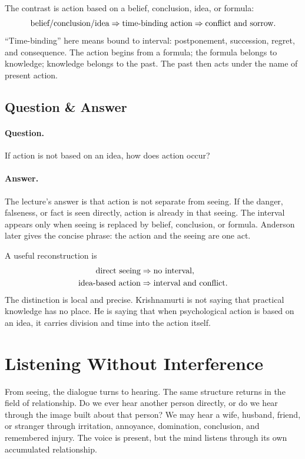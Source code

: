 The contrast is action based on a belief, conclusion, idea, or formula:
\begin{equation}
\hbox{belief/conclusion/idea}
\Rightarrow
\hbox{time-binding action}
\Rightarrow
\hbox{conflict and sorrow}.
\end{equation}
``Time-binding'' here means bound to interval: postponement, succession, regret, and consequence. The action begins from a formula; the formula belongs to knowledge; knowledge belongs to the past. The past then acts under the name of present action.

\subsection{Question \& Answer}

\paragraph{Question.}
If action is not based on an idea, how does action occur?

\paragraph{Answer.}
The lecture's answer is that action is not separate from seeing. If the danger, falseness, or fact is seen directly, action is already in that seeing. The interval appears only when seeing is replaced by belief, conclusion, or formula. Anderson later gives the concise phrase: the action and the seeing are one act.

A useful reconstruction is
\begin{align}
\hbox{direct seeing} &\Rightarrow \hbox{no interval},\\
\hbox{idea-based action} &\Rightarrow \hbox{interval and conflict}.
\end{align}
The distinction is local and precise. Krishnamurti is not saying that practical knowledge has no place. He is saying that when psychological action is based on an idea, it carries division and time into the action itself.

\section{Listening Without Interference}

From seeing, the dialogue turns to hearing. The same structure returns in the field of relationship. Do we ever hear another person directly, or do we hear through the image built about that person? We may hear a wife, husband, friend, or stranger through irritation, annoyance, domination, conclusion, and remembered injury. The voice is present, but the mind listens through its own accumulated relationship.

